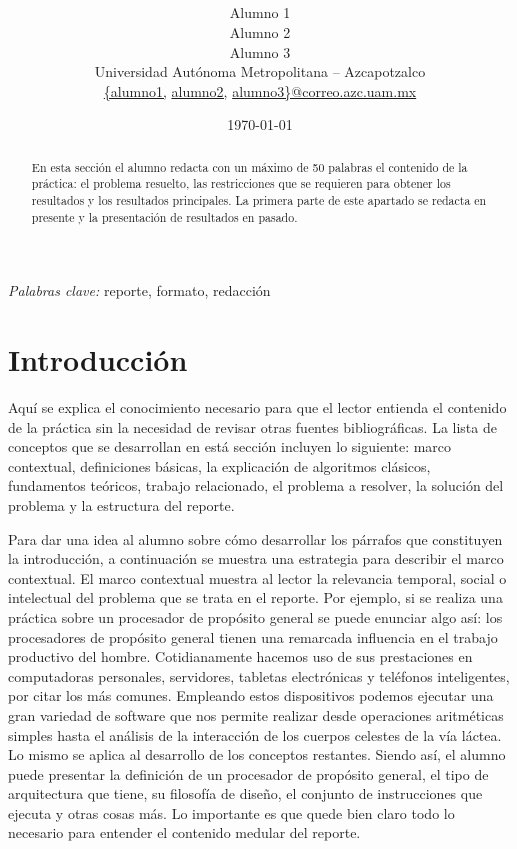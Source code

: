 \documentclass[12pt]{article}
\title{
   \blue{\textbf{Título del reporte no muy largo}}\\[-0.25cm] %
   \gray{\large Nombre de la UEA}\\ %
}
\author{Alumno 1\\ %
        Alumno 2\\
        Alumno 3\\
        Universidad Autónoma Metropolitana -- Azcapotzalco\\  %
        \href{mailto:alumno1@azc.uam.mx}{\{alumno1,}
        \href{mailto:alumno2@azc.uam.mx}{alumno2,}
        \href{mailto:alumno3@azc.uam.mx}{alumno3\}@correo.azc.uam.mx}
}
\date{\today} %
\begin{document}
\maketitle %


\begin{abstract}
\noindent En esta sección el alumno redacta con un máximo de 50 palabras el contenido de la práctica: el problema resuelto, las restricciones que se requieren para obtener los resultados y los resultados principales. La primera parte de este apartado se redacta en presente y la presentación de resultados en pasado.
\end{abstract}

\hspace*{3,6mm}\textit{Palabras clave:} reporte, formato, redacción%


\section{Introducción}

Aquí se explica el conocimiento necesario para que el lector entienda el 
contenido de la práctica sin la necesidad de revisar otras fuentes 
bibliográficas. La lista de conceptos que se desarrollan en está sección 
incluyen lo siguiente: marco contextual, definiciones básicas, la explicación 
de algoritmos clásicos, fundamentos teóricos, trabajo relacionado, el problema 
a resolver, la solución del problema y la estructura del reporte.

Para dar una idea al alumno sobre cómo desarrollar los párrafos que constituyen 
la introducción, a continuación se muestra una estrategia para describir el 
marco contextual. El marco contextual muestra al lector la relevancia temporal,
social o intelectual del problema que se trata en el reporte. Por ejemplo, si
se realiza una práctica sobre un procesador de propósito general se puede 
enunciar algo así: los procesadores de propósito general tienen una remarcada 
influencia en el trabajo productivo del hombre. Cotidianamente hacemos uso de 
sus prestaciones en computadoras personales, servidores, tabletas electrónicas 
y teléfonos inteligentes, por citar los más comunes. Empleando estos 
dispositivos podemos ejecutar una gran variedad de software que nos permite 
realizar desde operaciones aritméticas simples hasta el análisis de la 
interacción de los cuerpos celestes de la vía láctea. Lo mismo se aplica al 
desarrollo de los conceptos restantes. Siendo así, el alumno puede presentar 
la definición de un procesador de propósito general, el tipo de arquitectura 
que tiene, su filosofía de diseño, el conjunto de instrucciones que ejecuta y 
otras cosas más. Lo importante es que quede bien claro todo lo necesario para 
entender el contenido medular del reporte.
\end{document}

